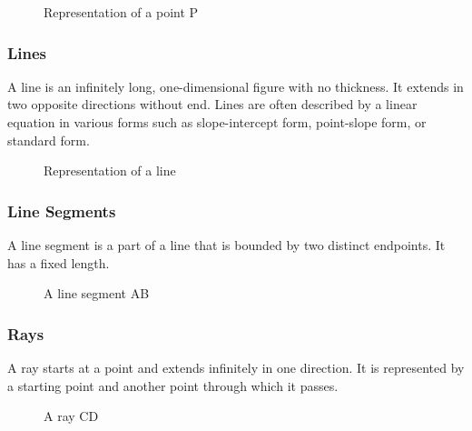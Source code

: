 \documentclass[a4paper,12pt]{book}
\begin{document}
\begin{figure}[H]
\centering
{}
\caption{Representation of a point P}
\end{figure}

\subsubsection{Lines}
A line is an infinitely long, one-dimensional figure with no thickness. It extends in two opposite directions without end. Lines are often described by a linear equation in various forms such as slope-intercept form, point-slope form, or standard form.

\begin{figure}[H]
\centering
{}
\caption{Representation of a line}
\end{figure}

\subsubsection{Line Segments}
A line segment is a part of a line that is bounded by two distinct endpoints. It has a fixed length.

\begin{figure}[H]
\centering
{}
\caption{A line segment AB}
\end{figure}

\subsubsection{Rays}
A ray starts at a point and extends infinitely in one direction. It is represented by a starting point and another point through which it passes.

\begin{figure}[H]
\centering
{}
\caption{A ray CD}
\end{figure}
\end{document}

